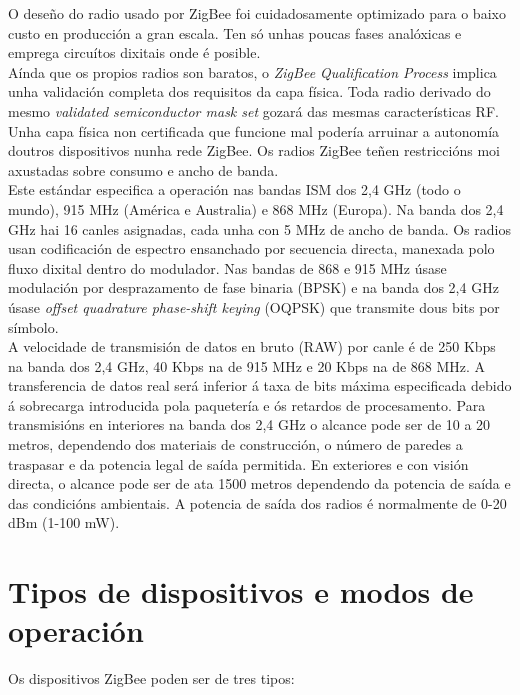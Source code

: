 O deseño do radio usado por ZigBee foi cuidadosamente optimizado para o baixo
custo en producción a gran escala. Ten só unhas poucas fases analóxicas e
emprega circuítos dixitais onde é posible. \\

Aínda que os propios radios son baratos, o
\textit{ZigBee Qualification Process} implica unha validación completa dos
requisitos da capa física. Toda radio derivado do mesmo
\textit{validated semiconductor mask set} gozará das mesmas características RF.
Unha capa física non certificada que funcione mal podería arruinar a autonomía
doutros dispositivos nunha rede ZigBee. Os radios ZigBee teñen restriccións moi
axustadas sobre consumo e ancho de banda. \\

Este estándar especifica a operación nas bandas ISM dos 2,4 GHz (todo o mundo),
915 MHz (América e Australia) e 868 MHz (Europa). Na banda dos 2,4 GHz hai 16
canles asignadas, cada unha con 5 MHz de ancho de banda. Os radios usan
codificación de espectro ensanchado por secuencia directa, manexada polo fluxo
dixital dentro do modulador. Nas bandas de 868 e 915 MHz úsase modulación por
desprazamento de fase binaria (BPSK) e na banda dos 2,4 GHz úsase
\textit{offset quadrature phase-shift keying} (OQPSK) que transmite dous bits
por símbolo. \\

A velocidade de transmisión de datos en bruto (RAW) por canle é de 250 Kbps na
banda dos 2,4 GHz, 40 Kbps na de 915 MHz e 20 Kbps na de 868 MHz. A
transferencia de datos real será inferior á taxa de bits máxima especificada
debido á sobrecarga introducida pola paquetería e ós retardos de procesamento.
Para transmisións en interiores na banda dos 2,4 GHz o alcance pode ser de 10 a
20 metros, dependendo dos materiais de construcción, o número de paredes a
traspasar e da potencia legal de saída permitida. En exteriores e con visión
directa, o alcance pode ser de ata 1500 metros dependendo da potencia de saída
e das condicións ambientais. A potencia de saída dos radios é normalmente de
0-20 dBm (1-100 mW).

\section{Tipos de dispositivos e modos de operación}

Os dispositivos ZigBee poden ser de tres tipos:

